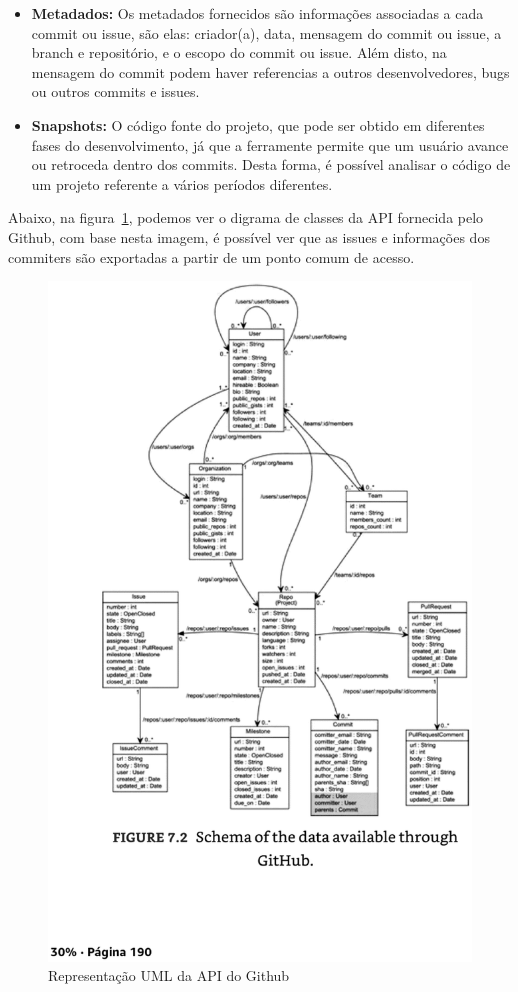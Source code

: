 \begin{itemize}
\item \textbf{Metadados:} Os metadados fornecidos são informações associadas a cada
commit ou issue, são elas: criador(a), data, mensagem do commit ou issue, a branch e repositório,
e o escopo do commit ou issue. Além disto, na mensagem do commit podem haver referencias a outros
desenvolvedores, bugs ou outros commits e issues.
\item \textbf{Snapshots:} O código fonte do projeto, que pode ser obtido em diferentes
fases do desenvolvimento, já que a ferramente permite que um usuário avance ou retroceda
dentro dos commits. Desta forma, é possível analisar o código de um projeto referente
a vários períodos diferentes.
\end{itemize}

Abaixo, na figura~\ref{fig:github_api}, podemos ver o digrama de classes da API fornecida pelo
Github, com base nesta imagem, é possível ver que as issues e informações dos commiters
são exportadas a partir de um ponto comum de acesso.

\begin{figure}[h]
    \centering
        \includegraphics[keepaspectratio=true,scale=0.3]{figuras/github_api_diagram.eps}
    \caption{Representação UML da API do Github}
    \label{fig:github_api}
\end{figure}

